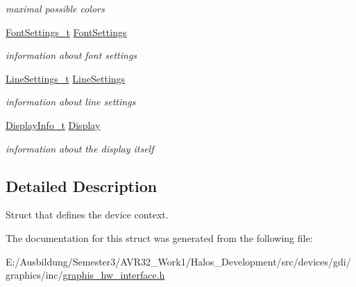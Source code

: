 \begin{CompactItemize}
\begin{CompactList}\small\item\em maximal possible colors \item\end{CompactList}\item 
\hypertarget{struct_device_context__t_3c447b3af8870b05c8dc0ba416cb0d02}{
\hyperlink{struct_font_settings__t}{FontSettings\_\-t} \hyperlink{struct_device_context__t_3c447b3af8870b05c8dc0ba416cb0d02}{FontSettings}}
\label{struct_device_context__t_3c447b3af8870b05c8dc0ba416cb0d02}

\begin{CompactList}\small\item\em information about font settings \item\end{CompactList}\item 
\hypertarget{struct_device_context__t_1b31e011cbea7dbd83f12b8f64593b5e}{
\hyperlink{struct_line_settings__t}{LineSettings\_\-t} \hyperlink{struct_device_context__t_1b31e011cbea7dbd83f12b8f64593b5e}{LineSettings}}
\label{struct_device_context__t_1b31e011cbea7dbd83f12b8f64593b5e}

\begin{CompactList}\small\item\em information about line settings \item\end{CompactList}\item 
\hypertarget{struct_device_context__t_5611d02e13f7ba77cd3048c62a5c5ae8}{
\hyperlink{struct_display_info__t}{DisplayInfo\_\-t} \hyperlink{struct_device_context__t_5611d02e13f7ba77cd3048c62a5c5ae8}{Display}}
\label{struct_device_context__t_5611d02e13f7ba77cd3048c62a5c5ae8}

\begin{CompactList}\small\item\em information about the display itself \item\end{CompactList}\end{CompactItemize}


\subsection{Detailed Description}
Struct that defines the device context. 

The documentation for this struct was generated from the following file:\begin{CompactItemize}
\item 
E:/Ausbildung/Semester3/AVR32\_\-Work1/Halos\_\-Development/src/devices/gdi/graphics/inc/\hyperlink{graphis__hw__interface_8h}{graphis\_\-hw\_\-interface.h}\end{CompactItemize}
